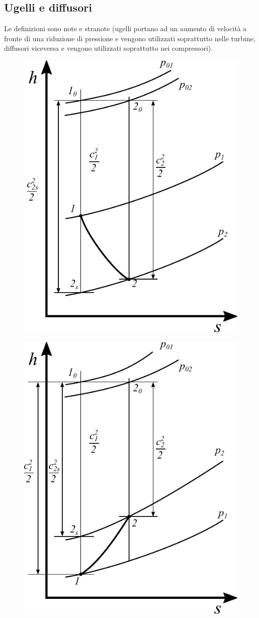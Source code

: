 \subsection{Ugelli e diffusori}
Le definizioni sono note e stranote (ugelli portano ad un aumento di velocità a fronte di una riduzione di pressione e vengono utilizzati soprattutto nelle turbine, diffusori viceversa e vengono utilizzati soprattutto nei compressori).
\begin{figure}
\centering
\begin{minipage}{.5\textwidth}
  \centering
  \includegraphics[width=.6\linewidth]{fig/Ugello.pdf}
  \label{}
\end{minipage}%
\begin{minipage}{.5\textwidth}
  \centering
  \includegraphics[width=.6\linewidth]{fig/Diffusore.pdf}
  \label{}
\end{minipage}
\end{figure}
